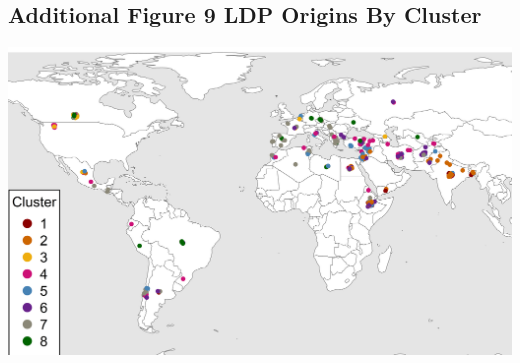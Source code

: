 \documentclass[
]{article}
\begin{document}
\hypertarget{additional-figure-9-ldp-origins-by-cluster}{%
\subsection{Additional Figure 9 LDP Origins By
Cluster}\label{additional-figure-9-ldp-origins-by-cluster}}

\includegraphics{Additional/Additional_Figure_09.png}
\end{document}
